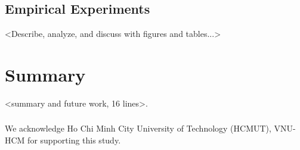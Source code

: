 \documentclass[runningheads]{llncs}
\begin{document}
\subsection{Empirical Experiments}\label{exp2}
<Describe, analyze, and discuss with figures and tables...>


\section{Summary}\label{sec5}
<summary and future work, 16 lines>.

\begin{credits}
\subsubsection{\ackname} We acknowledge Ho Chi Minh City University of Technology (HCMUT), VNU-HCM for supporting this study.

\end{credits}
%
%
%


%




\end{document}
